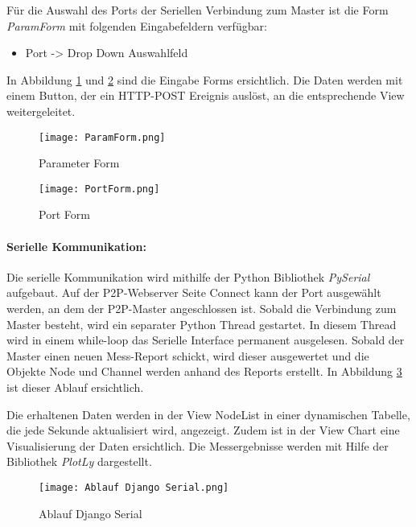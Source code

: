 Für die Auswahl des Ports der Seriellen Verbindung zum Master ist die Form \textit{ParamForm} mit folgenden Eingabefeldern verfügbar:
\begin{itemize}
	\item  Port \hspace{22mm} -> Drop Down Auswahlfeld
\end{itemize}

In Abbildung \ref{fig:ParamForm} und \ref{fig:PortForm} sind die Eingabe Forms ersichtlich. Die Daten werden mit einem Button, der ein HTTP-POST Ereignis auslöst, an die entsprechende View weitergeleitet.

\begin{figure} [H]
	\centering
	\texttt{[image: ParamForm.png]}
	\caption{Parameter Form}
	\label{fig:ParamForm}
\end{figure}

\begin{figure} [H]
	\centering
	\texttt{[image: PortForm.png]}
	\caption{Port Form}
	\label{fig:PortForm}
\end{figure}

\paragraph{Serielle Kommunikation:}
Die serielle Kommunikation wird mithilfe der Python Bibliothek \textit{PySerial} aufgebaut. Auf der P2P-Webserver Seite Connect kann der Port ausgewählt werden, an dem der P2P-Master angeschlossen ist. Sobald die Verbindung zum Master besteht, wird ein separater Python Thread gestartet. In diesem Thread wird in einem while-loop das Serielle Interface permanent ausgelesen. Sobald der Master einen neuen Mess-Report schickt, wird dieser ausgewertet und die Objekte Node und Channel werden anhand des Reports erstellt. In Abbildung \ref{fig:AblaufDjangoSerial} ist dieser Ablauf ersichtlich.

Die erhaltenen Daten werden in der View Node\textunderscore List in einer dynamischen Tabelle, die jede Sekunde aktualisiert wird, angezeigt. Zudem ist in der View Chart eine Visualisierung der Daten ersichtlich. Die Messergebnisse werden mit Hilfe der Bibliothek \textit{PlotLy} dargestellt. 

\begin{figure} [H]
	\centering
	\texttt{[image: Ablauf Django Serial.png]}
	\caption{Ablauf Django Serial}
	\label{fig:AblaufDjangoSerial}
\end{figure}

